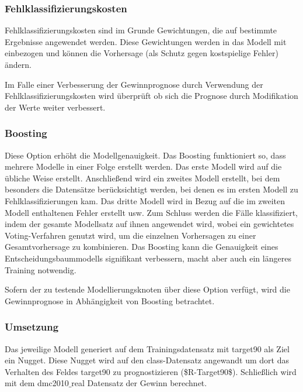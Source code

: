 \documentclass[a4paper,12pt]{article}
\begin{document}
\subsubsection{Fehlklassifizierungskosten}
Fehlklassifizierungskosten sind im Grunde Gewichtungen, die auf bestimmte Ergebnisse angewendet
werden. Diese Gewichtungen werden in das Modell mit einbezogen und können die Vorhersage (als Schutz gegen kostspielige Fehler) ändern. 

\par
\vspace{0.2cm}
Im Falle einer Verbesserung der Gewinnprognose durch Verwendung der Fehlklassifizierungskosten wird überprüft ob sich die Prognose durch Modifikation der Werte weiter verbessert.

\subsubsection{Boosting}

Diese Option erhöht die Modellgenauigkeit. Das Boosting funktioniert
so, dass mehrere Modelle in einer Folge erstellt werden. Das erste Modell wird auf die übliche Weise
erstellt. Anschließend wird ein zweites Modell erstellt, bei dem besonders die Datensätze berücksichtigt
werden, bei denen es im ersten Modell zu Fehlklassifizierungen kam. Das dritte Modell wird in Bezug
auf die im zweiten Modell enthaltenen Fehler erstellt usw. Zum Schluss werden die Fälle klassifiziert,
indem der gesamte Modellsatz auf ihnen angewendet wird, 
wobei ein gewichtetes Voting-Verfahren genutzt wird, um die einzelnen Vorhersagen zu einer Gesamtvorhersage zu kombinieren.
 Das Boosting kann die Genauigkeit eines Entscheidungsbaummodells signifikant verbessern, macht aber auch ein
längeres Training notwendig.
\par
\vspace{0.2cm}
Sofern der zu testende Modellierungsknoten über diese Option verfügt, wird die Gewinnprognose  in Abhängigkeit von Boosting betrachtet.

\subsubsection{Umsetzung}
Das jeweilige Modell generiert auf dem Trainingsdatensatz mit target90 als Ziel ein Nugget. Diese Nugget wird auf den class-Datensatz angewandt um dort das Verhalten des Feldes target90 zu prognostizieren (\$R-Target90\$). Schließlich wird mit dem  dmc2010$\_$real Datensatz der Gewinn berechnet.
\end{document}
